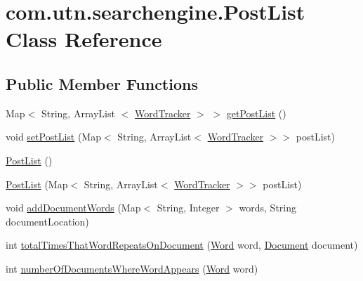 \hypertarget{classcom_1_1utn_1_1searchengine_1_1_post_list}{\section{com.\-utn.\-searchengine.\-Post\-List \-Class \-Reference}
\label{classcom_1_1utn_1_1searchengine_1_1_post_list}
}
\subsection*{\-Public \-Member \-Functions}
\begin{DoxyCompactItemize}
\item 
\-Map$<$ \-String, \-Array\-List\*
$<$ \hyperlink{classcom_1_1utn_1_1searchengine_1_1_word_tracker}{\-Word\-Tracker} $>$ $>$ \hyperlink{classcom_1_1utn_1_1searchengine_1_1_post_list_a3835cd78d9a6cbe59b2bcf078d90509c}{get\-Post\-List} ()
\item 
void \hyperlink{classcom_1_1utn_1_1searchengine_1_1_post_list_ac9f616ad84ee2a77cdadfbfe5730c2e8}{set\-Post\-List} (\-Map$<$ \-String, \-Array\-List$<$ \hyperlink{classcom_1_1utn_1_1searchengine_1_1_word_tracker}{\-Word\-Tracker} $>$$>$ post\-List)
\item 
\hyperlink{classcom_1_1utn_1_1searchengine_1_1_post_list_aa5b0c80862532321e12b5d1656b5efe8}{\-Post\-List} ()
\item 
\hyperlink{classcom_1_1utn_1_1searchengine_1_1_post_list_a6f4e25174e4d0523f22bfb612bdb6182}{\-Post\-List} (\-Map$<$ \-String, \-Array\-List$<$ \hyperlink{classcom_1_1utn_1_1searchengine_1_1_word_tracker}{\-Word\-Tracker} $>$$>$ post\-List)
\item 
void \hyperlink{classcom_1_1utn_1_1searchengine_1_1_post_list_af23ef7a6ccf86e12327af6c2b0f1e099}{add\-Document\-Words} (\-Map$<$ \-String, \-Integer $>$ words, \-String document\-Location)
\item 
int \hyperlink{classcom_1_1utn_1_1searchengine_1_1_post_list_a8f3297b7f1318ebb41af197f7b516cd8}{total\-Times\-That\-Word\-Repeats\-On\-Document} (\hyperlink{classcom_1_1utn_1_1searchengine_1_1_word}{\-Word} word, \hyperlink{classcom_1_1utn_1_1searchengine_1_1_document}{\-Document} document)
\item 
int \hyperlink{classcom_1_1utn_1_1searchengine_1_1_post_list_a1c1f62c62dd582404f6010a568a47daa}{number\-Of\-Documents\-Where\-Word\-Appears} (\hyperlink{classcom_1_1utn_1_1searchengine_1_1_word}{\-Word} word)
\item 

\end{DoxyCompactItemize}

